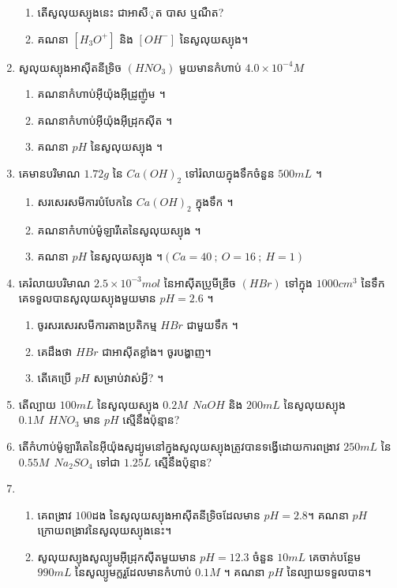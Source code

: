 \documentclass[12pt, a4paper]{article}
\begin{document}
\begin{enumerate}[m]
	\begin{enumerate}[k]
		\item តើសូលុយស្យុងនេះ ជាអាសីុត បាស ឬណឺត?
		\item គណនា $\left[H_3O^{+}\right]$ និង $\left[OH^{-}\right]$ នៃសូលុយស្យុង។
	\end{enumerate}
	\item សូលុយស្យុងអាសុីតនីទ្រិច $\left(HNO_3\right)$ មួយមានកំហាប់ $4.0\times 10^{-4}M$
	\begin{enumerate}[k]
		\item គណនាកំហាប់អុីយ៉ុងអុីដ្រូញ៉ូម ។
		\item គណនាកំហាប់អុីយ៉ុងអុីដ្រុកសុីត ។
		\item គណនា $pH$ នៃសូលុយស្យុង ។
	\end{enumerate}
	\item គេមានបរិមាណ $1.72g$ នៃ $Ca\left(OH\right)_{2}$ ទៅរំលាយក្នុងទឹកចំនួន $500mL$ ។
	\begin{enumerate}[k]
		\item សរសេរសមីការបំបែកនៃ $Ca\left(OH\right)_{2}$ ក្នុងទឹក ។
		\item គណនាកំហាប់ម៉ូឡារីតេនៃសូលុយស្យុង ។
		\item គណនា $pH$ នៃសូលុយស្យុង ។$\left(Ca=40~;~O=16~;~H=1\right)$
	\end{enumerate}
	\item គេរំលាយបរិមាណ $2.5 \times 10^{-3} mol$ នៃអាស៊ីតប្រូមីឌ្រីច $\left(HBr\right)$ ទៅក្នុង $1000 cm^{3}$ នៃទឹក គេទទួលបានសូលុយស្យុងមួយមាន $pH=2.6$ ។
	\begin{enumerate}[k]
		\item ចូរសរសេរសមីការតាងប្រតិកម្ម $HBr$ ជាមួយទឹក ។
		\item គេដឹងថា $HBr$ ជាអាសុីតខ្លាំង។ ចូរបង្ហាញ។
		\item តើគេប្រើ $pH$ សម្រាប់វាស់អ្វី? ។
	\end{enumerate}
	\item តើល្បាយ $100mL$ នៃសូលុយស្យុង $0.2M~~NaOH$ និង $200mL$ នៃសូលុយស្យុង $0.1M~~HNO_{3}$ មាន $pH$ ស្មើនឹងប៉ុន្មាន? 
	\item តើកំហាប់ម៉ូឡារីតេនៃអុីយ៉ុងសូដ្យូមនៅក្នុងសូលុយស្យុងត្រូវបានទង្វើដោយការពង្រាវ $250mL$ នៃ $0.55M~~Na_{2}SO_{4}$ ទៅជា $1.25L$ ស្មើនឹងប៉ុន្មាន?
	\item \begin{enumerate}[k]
		\item គេពង្រាវ $100$ដង នៃសូលុយស្យុងអាស៊ីតនីទ្រិចដែលមាន $pH=2.8$។ គណនា $pH$ ក្រោយពង្រាវនៃសូលុយស្យុងនេះ។  
		\item សូលុយស្យុងសូល្យូមអុីដ្រុកសុីតមួយមាន $pH=12.3$ ចំនួន $10mL$ គេចាក់បន្ថែម $990mL$ នៃសូល្យូមក្លរួដែលមានកំហាប់ $0.1M$ ។ គណនា $pH$ នៃល្បាយទទួលបាន។

\end{enumerate}
\end{enumerate}
\end{document}

